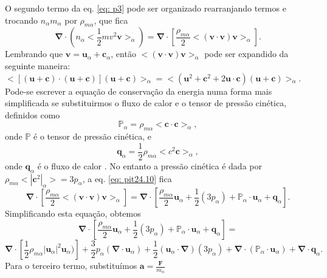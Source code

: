 \documentclass[12pt,oneside,a4paper]{abntex2}
\begin{document}
O segundo termo da eq. \ref{eq: p3} pode ser organizado rearranjando termos e trocando $ n_\alpha m_\alpha$ por $\rho_{m\alpha}$, que fica
\begin{equation}
\label{eq: pit24.10}
\bm{\nabla} \cdot (n_\alpha<\frac{1}{2}m v^2 \bm{v} >_\alpha) = \bm{\nabla} \cdot \left[ \frac{\rho_{m\alpha}}{2}<(\bm{v} \cdot \bm{v})\bm{v}>_\alpha \right] .
\end{equation}
Lembrando que $\bm{v} = \bm{u}_\alpha + \bm{c}_\alpha$, então  $<(\bm{v} \cdot \bm{v})\bm{v}>_\alpha$ pode ser expandido da seguinte maneira: $
<[(\bm{u} + \bm{c}) \cdot (\bm{u} + \bm{c})](\bm{u} + \bm{c})>_\alpha = <(\bm{u}^2 + \bm{c}^2+2\bm{u} \cdot \bm{c})(\bm{u} + \bm{c})>_\alpha$. 
Pode-se escrever a equação de conservação da energia numa forma mais simplificada se substituirmos o fluxo de calor e o tensor de pressão cinética, definidos como
\begin{equation}
\mathbb{P}_\alpha = \rho_{m\alpha}<\bm{c} \cdot \bm{c}>_\alpha ,
\end{equation}
onde $\mathbb{P}$ é o tensor de pressão cinética, e
\begin{equation}
\bm{q}_\alpha = \frac{1}{2} \rho_{m\alpha} <c^2 \bm{c}>_\alpha,
\end{equation}
onde $\bm{q}_\alpha$ é o fluxo de calor \cite[pg. 152]{bittencourt}. No entanto a pressão cinética é dada por $\rho_{m\alpha}<|\bm{c}^2|_\alpha>=3p_\alpha$, a eq. \ref{eq: pit24.10} fica
\begin{equation}
\label{eq: pit24.11}
\bm{\nabla} \cdot \left[ \frac{\rho_{m\alpha}}{2}<(\bm{v} \cdot \bm{v})\bm{v}>_\alpha \right]= \bm{\nabla} \cdot \left[ \frac{\rho_{m\alpha}}{2}\bm{u}_\alpha+\frac{1}{2}(3p_\alpha) + \mathbb{P}_\alpha \cdot \bm{u}_\alpha + \bm{q}_\alpha \right] .
\end{equation}
Simplificando esta equação, obtemos
\begin{equation}
\label{eq: pit24.13}
\bm{\nabla} \cdot \left[ \frac{\rho_{m\alpha}}{2}\bm{u}_\alpha+\frac{1}{2}(3p_\alpha) + \mathbb{P}_\alpha \cdot \bm{u}_\alpha + \bm{q}_\alpha \right] = 
\end{equation} 
\begin{equation*}
\bm{\nabla} \cdot \left[ \frac{1}{2}\rho_{m\alpha}|\bm{u}_\alpha|^2 \bm{u}_\alpha) \right]+ \frac{3}{2}p_\alpha (\bm{\nabla} \cdot \bm{u}_\alpha) +  \frac{1}{2}(\bm{u}_\alpha \cdot \bm{\nabla})(3p_\alpha)+\bm{\nabla} \cdot (\mathbb{P}_\alpha \cdot \bm{u}_\alpha) + \bm{\nabla} \cdot \bm{q}_\alpha .
\end{equation*}
Para o terceiro termo, substituímos $\bm{a} =  \frac{\bm{F}}{m_\alpha}$ 
\end{document}

